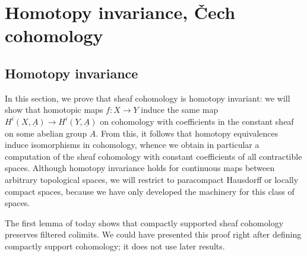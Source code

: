 \chapter{Homotopy invariance, Čech cohomology}

\section{Homotopy invariance}
\noindent
In this section, we prove that sheaf cohomology is homotopy invariant: we will show that homotopic maps \(f\colon X\to Y\) induce the same map \(H^i(X,\underline{A})\to H^i(Y,\underline{A})\) on cohomology with coefficients in the constant sheaf on some abelian group \(A\).
From this, it follows that homotopy equivalences induce isomorphisms in cohomology, whence we obtain in particular a computation of the sheaf cohomology with constant coefficients of all contractible spaces.
Although homotopy invariance holds for continuous maps between arbitrary topological spaces, we will restrict to paracompact Hausdorff or locally compact spaces, because we have only developed the machinery for this class of spaces.

The first lemma of today shows that compactly supported sheaf cohomology preserves filtered colimits.
We could have presented this proof right after defining compactly support cohomology; it does not use later results.

